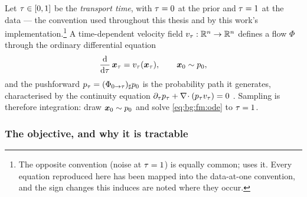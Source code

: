 Let $\tau \in [0,1]$ be the \emph{transport time}, with $\tau = 0$ at the prior and
$\tau = 1$ at the data --- the convention used throughout this thesis and by this work's
implementation.\footnote{The opposite convention (noise at $\tau=1$) is equally common;
\parencite{geng2025meanflow} uses it. Every equation reproduced here has been mapped into the
data-at-one convention, and the sign changes this induces are noted where they occur.}
A time-dependent velocity field $v_{\tau}:\mathbb{R}^{n}\to\mathbb{R}^{n}$ defines a flow
$\Phi$ through the ordinary differential equation
\begin{equation}\label{eq:bg:fm:ode}
  \frac{\mathrm{d}}{\mathrm{d}\tau}\,\boldsymbol{x}_{\tau} = v_{\tau}(\boldsymbol{x}_{\tau}),
  \qquad \boldsymbol{x}_{0} \sim p_{0},
\end{equation}
and the pushforward $p_{\tau} = (\Phi_{0\to\tau})_{\sharp}p_{0}$ is the probability path
it generates, characterised by the continuity equation
$\partial_{\tau}p_{\tau} + \nabla\!\cdot(p_{\tau}v_{\tau}) = 0$
\parencite[Sec.~2]{lipman2023flow}. Sampling is therefore integration: draw $\boldsymbol{x}_{0}\sim p_{0}$ and
solve \eqref{eq:bg:fm:ode} to $\tau = 1$.

\subsubsection*{The objective, and why it is tractable}

